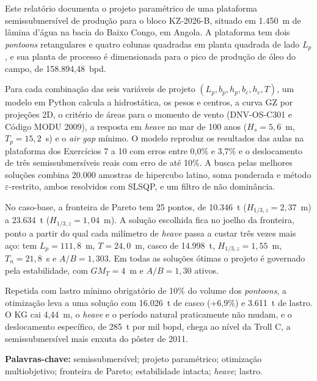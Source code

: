 \documentclass[11pt,a4paper]{article}
\newcommand{\Hz}{H_{1/3,z}}
\begin{document}
Este relatório documenta o projeto paramétrico de uma plataforma semissubmersível de produção
para o bloco KZ-2026-B, situado em 1.450~m de lâmina d'água na bacia do Baixo Congo, em Angola.
A plataforma tem dois \emph{pontoons} retangulares e quatro colunas quadradas em planta quadrada
de lado $L_p$, e sua planta de processo é dimensionada para o pico de produção de óleo do campo,
de 158.894,48~bpd.

Para cada combinação das seis variáveis de projeto $(L_p, b_p, h_p, b_c, h_c, T)$, um modelo em
Python calcula a hidrostática, os pesos e centros, a curva GZ por projeções 2D, o critério de
áreas para o momento de vento (DNV-OS-C301 e Código MODU 2009), a resposta em \emph{heave} no mar
de 100 anos ($H_s = 5{,}6$~m, $T_p = 15{,}2$~s) e o \emph{air gap} mínimo. O modelo reproduz os
resultados das aulas na plataforma dos Exercícios 7 a 10 com erros entre 0,0\% e 3,7\% e o
deslocamento de três semissubmersíveis reais com erro de até 10\%. A busca pelas melhores
soluções combina 20.000 amostras de hipercubo latino, soma ponderada e método
$\varepsilon$-restrito, ambos resolvidos com SLSQP, e um filtro de não dominância.

No caso-base, a fronteira de Pareto tem 25 pontos, de 10.346~t ($\Hz = 2{,}37$~m) a 23.634~t
($\Hz = 1{,}04$~m). A solução escolhida fica no joelho da fronteira, ponto a partir do qual cada
milímetro de \emph{heave} passa a custar três vezes mais aço: tem $L_p = 111{,}8$~m,
$T = 24{,}0$~m, casco de 14.998~t, $\Hz = 1{,}55$~m, $T_n = 21{,}8$~s e $A/B = 1{,}303$. Em todas
as soluções ótimas o projeto é governado pela estabilidade, com $GM_T = 4$~m e $A/B = 1{,}30$
ativos.

Repetida com lastro mínimo obrigatório de 10\% do volume dos \emph{pontoons}, a otimização leva
a uma solução com 16.026~t de casco (+6,9\%) e 3.611~t de lastro. O KG cai 4,44~m, o
\emph{heave} e o período natural praticamente não mudam, e o deslocamento específico, de 285~t
por mil bopd, chega ao nível da Troll C, a semissubmersível mais enxuta do pôster de 2011.

\vspace{0.8em}
\noindent\textbf{\sffamily\color{azul}Palavras-chave:} semissubmersível; projeto paramétrico;
otimização multiobjetivo; fronteira de Pareto; estabilidade intacta; \emph{heave}; lastro.

\clearpage
\tableofcontents
\clearpage
\listoffigures
\clearpage
\listoftables
\clearpage
\listofcodigos

\end{document}
